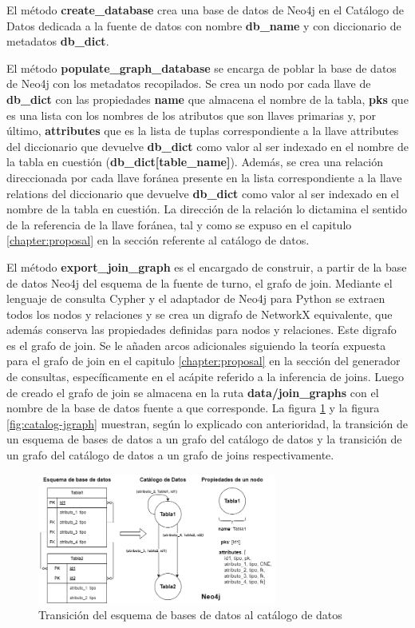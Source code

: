 El método \textbf{create\_database} crea una base de datos de Neo4j en el Catálogo de Datos dedicada a la 
fuente de datos con nombre \textbf{db\_name} y con diccionario de metadatos \textbf{db\_dict}. 

El método \textbf{populate\_graph\_database} se encarga de poblar la base de datos de Neo4j con los metadatos
recopilados. Se crea 
un nodo por cada llave 
de \textbf{db\_dict} con las propiedades \textbf{name} que almacena el nombre de la tabla, \textbf{pks} que es una 
lista con los nombres de los atributos que son llaves primarias y, por \'ultimo, \textbf{attributes} que 
es la lista de tuplas correspondiente a la llave attributes del diccionario que devuelve \textbf{db\_dict} como valor
al ser indexado  en el nombre de la tabla en cuestión (\textbf{db\_dict[table\_name]}). Además, se crea una relación direccionada por cada llave for\'anea 
presente en la lista correspondiente a la llave relations del diccionario que devuelve \textbf{db\_dict} 
como valor al ser indexado en el nombre de la tabla en cuestión. La dirección de la relación lo dictamina 
el sentido de la referencia de la llave 
for\'anea, tal y como se expuso en el capitulo \ref{chapter:proposal} en la sección referente al catálogo de 
datos.

El método \textbf{export\_join\_graph} es el encargado de construir, a partir de la base de datos Neo4j del esquema 
de la fuente de turno, el grafo de join. Mediante el lenguaje de consulta Cypher y el adaptador de Neo4j para Python 
se extraen todos los nodos y relaciones y se crea un digrafo de NetworkX equivalente, que además conserva las 
propiedades definidas para nodos y relaciones. Este digrafo es el grafo de join. Se le añaden arcos 
adicionales siguiendo la teoría expuesta para el grafo de join en el capitulo \ref{chapter:proposal} en la 
sección del generador de consultas, específicamente en el ac\'apite referido a la inferencia de joins. 
Luego 
de creado el grafo de join se almacena en la ruta \textbf{data/join\_graphs} con el nombre de la base de datos fuente 
a que corresponde. La figura \ref{fig:schema-catalog} y la figura \ref{fig:catalog-jgraph} muestran, seg\'un lo 
explicado con anterioridad, la 
transici\'on de un esquema de bases de datos a un grafo del cat\'alogo de datos y la 
transición de un grafo del cat\'alogo de datos a un grafo de joins respectivamente. 

\begin{figure}[H]
    \centering
    \includegraphics[width=0.7\textwidth]{Graphics/schema-catalog.drawio.png}
    \caption{Transición del esquema de bases de datos al cat\'alogo de datos}
    \label{fig:schema-catalog}
\end{figure}

